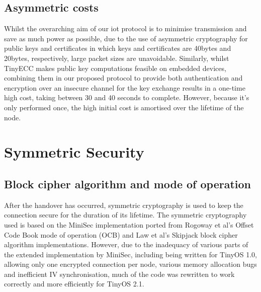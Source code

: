 \documentclass[conference]{./sty/IEEEtran}
\begin{document}
\subsection{Asymmetric costs} %
\label{sub:asymmetric_payload_sizes}
Whilst the overarching aim of our iot protocol is to minimise transmission and save as much power as possible, due to the use of asymmetric cryptography for public keys and certificates in which keys and certificates are 40bytes and 20bytes, respectively, large packet sizes are unavoidable. Similarly, whilst TinyECC makes public key computations feasible on embedded devices, combining them in our proposed protocol to provide both authentication and encryption over an insecure channel for the key exchange results in a one-time high cost, taking between 30 and 40 seconds to complete. However, because it's only performed once, the high initial cost is amortised over the lifetime of the node. 

\section{Symmetric Security} %
\label{sec:symmetric_security}
\subsection{Block cipher algorithm and mode of operation} %
\label{sub:cipher_block_algorithm_and_mode_of_operation}
After the handover has occurred, symmetric cryptography is used to keep the connection secure for the duration of its lifetime. The symmetric cryptography used is based on the MiniSec implementation ported from Rogoway et al's Offset Code Book mode of operation (OCB)\cite{OCB} and Law et al's Skipjack block cipher algorithm\cite{Skipjack} implementations. However, due to the inadequacy of various parts of the extended implementation by MiniSec\cite{MiniSecLink}, including being written for TinyOS 1.0, allowing only one encrypted connection per node, various memory allocation bugs and inefficient IV synchronisation, much of the code was rewritten to work correctly and more efficiently for TinyOS 2.1. 
\end{document}
